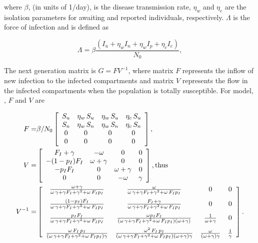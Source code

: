 \documentclass[12pt]{article}
\theoremstyle{definition} %
\begin{document}
where $\beta$, (in units of 1/day), is the disease transmission rate, $\eta_w$ and $\eta_c$ are the isolation parameters for awaiting and reported individuals, respectively. $\Lambda$ is the force of infection and is defined as 

\begin{equation}
\label{Lambda}
\Lambda=\beta \frac{(I_u+\eta_w I_n+\eta_w I_p+ \eta_c I_c)}{N_0},
\end{equation}


The next generation matrix is $G = F V^{-1}$, where matrix $F$ represents the inflow of new infection to the infected compartments and matrix $V$ represents the flow in the infected compartments when the population is totally susceptible. For model, , $F$ and $V$ are

\begin{align}
\label{FV}
F =& \beta/N_0 \left[ \begin {array}{cccc} 
S_u&\eta_w\,S_u&\eta_w\,S_u&\eta_c\,S_u\\
S_n&\eta_w\,S_n&\eta_w\,S_n&\eta_c\,S_n\\ 
0&0&0&0\\
0&0&0&0
 \end {array} \right], \\
  V =&
 \left[ \begin {array}{cccc}  
F_I+\gamma&-\omega&0&0\\
-(1-p_I)F_I&\omega+\gamma&0&0\\
-p_I F_I&0&\omega+\gamma&0\\
0&0&-\omega&\gamma
\end {array} \right], \text{thus}\\
V^{-1} =&
\left[ \begin {array}{cccc}
\frac {\omega+\gamma}{\omega\,\gamma+\gamma F_I+\gamma^2+\omega\, F_I p_I}&\frac {\omega}{\omega\,\gamma+\gamma F_I+\gamma^2+\omega\, F_I p_I}&0&0\\
\noalign{\medskip}
\frac{(1-p_I) F_I}{\omega\,\gamma+\gamma F_I+\gamma^2+\omega\, F_I p_I}&
\frac{F_I+\gamma}{\omega\,\gamma+\gamma F_I+\gamma^2+\omega\, F_I p_I}&0&0\\
\noalign{\medskip}
\frac{p_I F_I}{\omega\,\gamma+\gamma F_I+\gamma^2+\omega\, F_I p_I}&
\frac{\omega p_I F_I}{(\omega\,\gamma+\gamma F_I+\gamma^2+\omega\, F_I p_I)(\omega+\gamma)}& \frac{1}{\omega+\gamma}&0 \\
\noalign{\medskip}
\frac{\omega\,F_I\,p_I}{(\omega\,\gamma+\gamma F_I+\gamma^2+\omega\, F_I p_I) \gamma}& 
\frac{\omega^2\,F_I\,p_I}{(\omega\,\gamma+\gamma F_I+\gamma^2+\omega\, F_I p_I)(\omega+\gamma) \gamma}&
\frac{\omega}{(\omega+\gamma) \gamma}&
\frac{1}{\gamma}
\end {array} \right].
\end{align}
\end{document}

